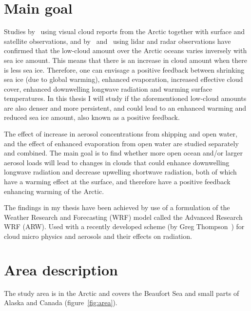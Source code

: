 \section{Main goal}
Studies by~\citet{Eastman2010a} using visual cloud reports from the Arctic together with surface and satellite observations, and by~\citet{Kay2009} and~\citet{Palm2010} using lidar and radar observations have confirmed that the low-cloud amount over the Arctic oceans varies inversely with sea ice amount. This means that there is an increase in cloud amount when there is less sea ice. Therefore, one can envisage a positive feedback between shrinking sea ice (due to global warming), enhanced evaporation, increased effective cloud cover, enhanced downwelling longwave radiation and warming surface temperatures. In this thesis I will study if the aforementioned low-cloud amounts are also denser and more persistent, and could lead to an enhanced warming and reduced sea ice amount, also known as a positive feedback.

The effect of increase in aerosol concentrations from shipping and open water, and the effect of enhanced evaporation from open water are studied separately and combined. The main goal is to find whether more open ocean and/or larger aerosol loads will lead to changes in clouds that could enhance downwelling longwave radiation and decrease upwelling shortwave radiation, both of which have a warming effect at the surface, and therefore have a positive feedback enhancing warming of the Arctic.


The findings in my thesis have been achieved by use of a formulation of the Weather Research and Forecasting (WRF) model called the Advanced Research WRF (ARW). Used with a recently developed scheme (by Greg Thompson~\citep{Thompson2014}) for cloud micro physics and aerosols and their effects on radiation.

\section{Area description}
The study area is in the Arctic and covers the Beaufort Sea and small parts of Alaska and Canada (figure~\ref{fig:area}).

